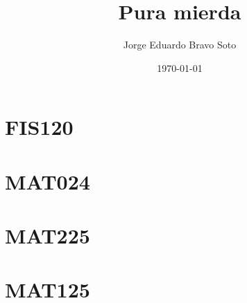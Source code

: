 \documentclass{article}
\title{Pura mierda}
\author{Jorge Eduardo Bravo Soto}
\date{\today}
\theoremstyle{plain}
\theoremstyle{definition}
\begin{document}
\maketitle
\tableofcontents

\section{FIS120}


\section{MAT024}


\section{MAT225}


\section{MAT125}

\end{document}
